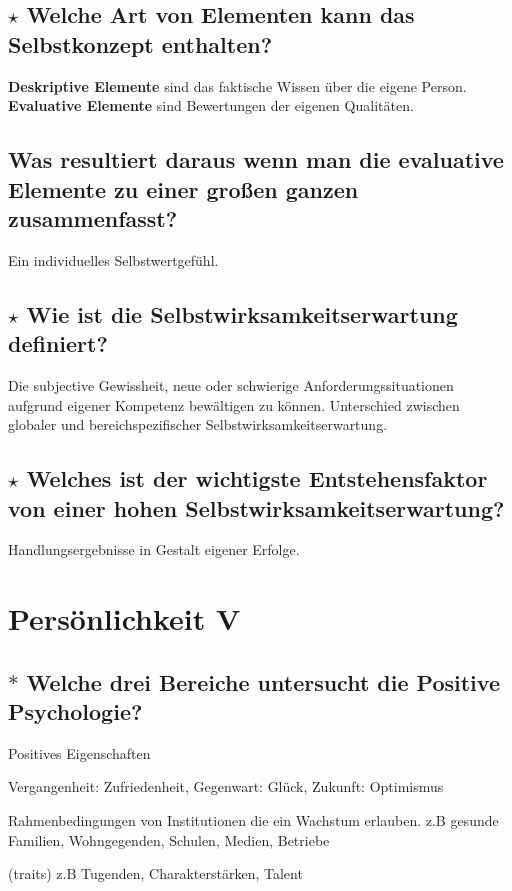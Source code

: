 \documentclass[a4paper,9pt,DIV=14]{scrartcl}
\begin{document}
\subsection{$\star$ Welche Art von Elementen kann das Selbstkonzept enthalten?} %
\textbf{Deskriptive Elemente} sind das faktische Wissen über die eigene Person.\\
\textbf{Evaluative Elemente} sind Bewertungen der eigenen Qualitäten.
\subsection{Was resultiert daraus wenn man die evaluative Elemente zu einer großen ganzen zusammenfasst?}
Ein individuelles Selbstwertgefühl.
\subsection{$\star$ Wie ist die Selbstwirksamkeitserwartung definiert?} %
Die subjective Gewissheit, neue oder schwierige Anforderungssituationen aufgrund eigener Kompetenz bewältigen zu können.
Unterschied zwischen globaler und bereichspezifischer Selbstwirksamkeitserwartung.
\subsection{$\star$ Welches ist der wichtigste Entstehensfaktor von einer hohen Selbstwirksamkeitserwartung?} %
Handlungsergebnisse in Gestalt eigener Erfolge.


\section{Persönlichkeit V}
\subsection{$\ast$ Welche drei Bereiche untersucht die Positive Psychologie?} %
\begin{labeling}{Positives Eigenschaften}
\item [Positives Erleben] Vergangenheit: Zufriedenheit, Gegenwart: Glück, Zukunft: Optimismus
\item [Positive Institutionen] Rahmenbedingungen von Institutionen die ein Wachstum erlauben. z.B gesunde Familien, Wohngegenden, Schulen, Medien, Betriebe
\item [Positives Eigenschaften] (traits) z.B Tugenden, Charakterstärken, Talent
\end{labeling}
\end{document}
